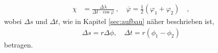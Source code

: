 \begin{align}\label{Eichgrosse}
	\chi &= \frac{\Delta\lambda}{\Delta t\cdot\cos\overline{\varphi}} \ , \quad \overline{\varphi} = \frac{1}{2}(\varphi_1 + \varphi_2) \quad ,
\end{align}
wobei $\Delta s$ und $\Delta t$, wie in Kapitel \ref{sec:aufbau} näher beschrieben ist,
\begin{align}
	\Delta s = r \Delta \phi , \quad \Delta t = r (\phi_1 - \phi_2)
\end{align}
betragen.

